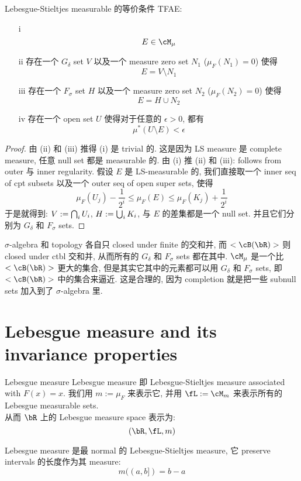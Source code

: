 \documentclass[lang=cn,11pt]{elegantbook}
\begin{document}
\begin{theorem}{Lebesgue-Stieltjes measurable 的等价条件}
\label{Lebesgue-Stieltjes measurable 的等价条件}
TFAE:
\begin{enumerate}
    \item[i] $$E \in \cM_\mu$$
    \item[ii] 存在一个 $G_\delta$ set $V$ 以及一个 measure zero set $N_1$ ($\mu_F(N_1) = 0$) 使得   $$E = V \setminus N_1$$
    \item[iii] 存在一个 $F_\sigma$ set $H$ 以及一个 measure zero set $N_2$ ($\mu_F(N_2) = 0$) 使得 $$E = H \cup N_2$$
    \item[iv] 存在一个 open set $U$ 使得对于任意的 $\epsilon > 0$, 都有 $$\mu^*(U \setminus E) < \epsilon $$
\end{enumerate}
\end{theorem}

\begin{proof}
由 (ii) 和 (iii) 推得 (i) 是 trivial 的. 这是因为 LS measure 是 complete measure, 任意 null set 都是 measurable 的.
由 (i) 推 (ii) 和 (iii): follows from outer 与 inner regularity. 假设 $E$ 是 LS-measurable 的, 我们直接取一个 inner seq of cpt subsets 以及一个 outer seq of open super sets, 使得
\begin{equation}
    \mu_F(U_j) -  \frac{1}{2^i} \leq \mu_F(E) \leq \mu_F(K_j ) + \frac{1}{2^i}
\end{equation}
于是就得到: $V := \bigcap_i U_i$, $H := \bigcup_i K_i$, 与 $E$ 的差集都是一个 null set. 并且它们分别为 $G_\delta$ 和 $F_\sigma$ sets.
\end{proof}
\begin{remark}
    $\sigma$-algebra 和 topology 各自只 closed under finite 的交和并, 而 $<\cB(\bR)>$ 则 closed under ctbl 交和并, 从而所有的  $G_\delta$ 和 $F_\sigma$ sets 都在其中. $\cM_\mu$ 是一个比 $<\cB(\bR)>$ 更大的集合, 但是其实它其中的元素都可以用 $G_\delta$ 和 $F_\sigma$ sets, 即 $<\cB(\bR)>$ 中的集合来逼近. 这是合理的, 因为 completion 就是把一些 subnull sets 加入到了 $\sigma$-algebra 里.
\end{remark}





\section{Lebesgue measure and its invariance properties}
\begin{definition}{Lebesgue measure}
Lebesgue measure 即 Lebesgue-Stieltjes measure associated with $F(x) = x$.
我们用 $m:=\mu_F$ 来表示它, 并用 $\fL := \cM_m$ 来表示所有的 Lebesgue measurable sets.\\
从而 $\bR$ 上的 Lebesgue measure space 表示为:
$$
(\bR, \fL, m)
$$
\end{definition}
\begin{remark}
    Lebesgue measure 是最 normal 的 Lebesgue-Stieltjes measure, 它 preserve intervals 的长度作为其 measure: 
    $$
    m((a,b]) = b -a
    $$
\end{remark}
\end{document}
